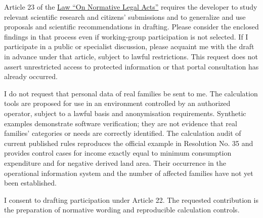 \documentclass[14pt,a4paper]{extarticle}
\begin{document}
Article 23 of the \href{https://lex.uz/docs/-5378966}{Law “On Normative Legal Acts”} requires the developer to study relevant scientific research and citizens’ submissions and to generalize and use proposals and scientific recommendations in drafting. Please consider the enclosed findings in that process even if working-group participation is not selected. If I participate in a public or specialist discussion, please acquaint me with the draft in advance under that article, subject to lawful restrictions. This request does not assert unrestricted access to protected information or that portal consultation has already occurred.

I do not request that personal data of real families be sent to me. The calculation tools are proposed for use in an environment controlled by an authorized operator, subject to a lawful basis and anonymisation requirements. Synthetic examples demonstrate software verification; they are not evidence that real families’ categories or needs are correctly identified. The calculation audit of current published rules reproduces the official example in Resolution No. 35 and provides control cases for income exactly equal to minimum consumption expenditure and for negative derived land area. Their occurrence in the operational information system and the number of affected families have not yet been established.

I consent to drafting participation under Article 22. The requested contribution is the preparation of normative wording and reproducible calculation controls.
\end{document}
